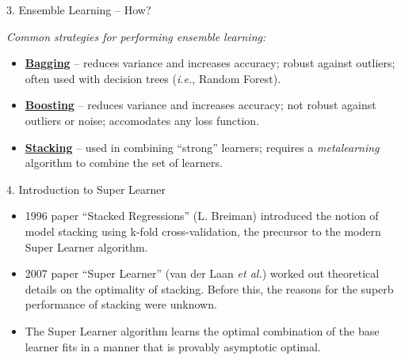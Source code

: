 \documentclass[12pt,t]{beamer}
\begin{document}
\begin{frame}[c]{3. Ensemble Learning -- How?}

\vspace*{3mm}

\textit{Common strategies for performing ensemble learning:}

\vspace{1em}

\centering

  \begin{itemize}
    \itemsep12pt
    \item \underline{\textbf{Bagging}} -- reduces variance and increases
          accuracy; robust against outliers; often used with decision trees
          (\textit{i.e.}, Random Forest).
    \item \underline{\textbf{Boosting}} -- reduces variance and increases
          accuracy; not robust against outliers or noise; accomodates any loss
          function.
    \item \underline{\textbf{Stacking}} -- used in combining ``strong''
          learners; requires a \textit{metalearning} algorithm to combine the
          set of learners.
  \end{itemize}

\end{frame}


\begin{frame}[c]{4. Introduction to Super Learner}

\vspace*{3mm}

\centering

  \begin{itemize}
    \itemsep12pt
    \item 1996 paper ``Stacked Regressions'' (L. Breiman) introduced the notion
          of model stacking using k-fold cross-validation, the precursor to the
          modern Super Learner algorithm.
    \item 2007 paper ``Super Learner'' (van der Laan \textit{et al.}) worked out
          theoretical details on the optimality of stacking. Before this, the
          reasons for the superb performance of stacking were unknown.
    \item The Super Learner algorithm learns the optimal combination of the
          base learner fits in a manner that is provably asymptotic optimal.
  \end{itemize}

\end{frame}
\end{document}
